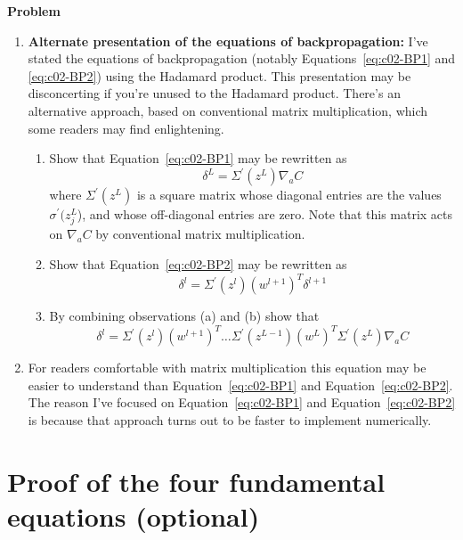 \textbf{Problem}

\begin{enumerate}
\item 
\textbf{Alternate presentation of the equations of backpropagation: }
I've stated the equations of backpropagation (notably Equations~\ref{eq:c02-BP1} and \ref{eq:c02-BP2}) using the Hadamard product. This presentation may be disconcerting if you're unused to the Hadamard product. There's an alternative approach, based on conventional matrix multiplication, which some readers may find enlightening. 
\begin{enumerate}
\item 
Show that Equation~\ref{eq:c02-BP1} may be rewritten as 
\begin{equation}
\delta^{L}=\Sigma^{\prime}\left(z^{L}\right) \nabla_{a} C
\label{eq:c02-33}
\end{equation}
where $\Sigma^{\prime}\left(z^{L}\right)$ is a square matrix whose diagonal entries are the values $\sigma^\prime(z^L_j$), and whose off-diagonal entries are zero. Note that this matrix acts on $\nabla_{a} C$ by conventional matrix multiplication. 

\item 
Show that Equation~\ref{eq:c02-BP2} may be rewritten as 
\begin{equation}
\delta^{l}=\Sigma^{\prime}\left(z^{l}\right)\left(w^{l+1}\right)^{T} \delta^{l+1}
\label{eq:c02-34}
\end{equation}
\item 
By combining observations (a) and (b) show that 
\begin{equation}
\delta^{l}=\Sigma^{\prime}\left(z^{l}\right)\left(w^{l+1}\right)^{T} \ldots \Sigma^{\prime}\left(z^{L-1}\right)\left(w^{L}\right)^{T} \Sigma^{\prime}\left(z^{L}\right) \nabla_{a} C
\label{eq:c02-35}
\end{equation}
\end{enumerate}

\item 
For readers comfortable with matrix multiplication this equation may be easier to understand than Equation~\ref{eq:c02-BP1} and Equation~\ref{eq:c02-BP2}. The reason I've focused on Equation~\ref{eq:c02-BP1} and Equation~\ref{eq:c02-BP2} is because that approach turns out to be faster to implement numerically. 
\end{enumerate}



\section{Proof of the four fundamental equations (optional)}
\label{sec:Proofofthefourfundamentalequations(optional)}

